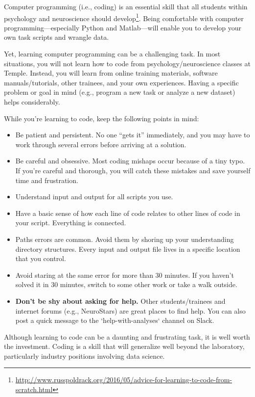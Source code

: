 \documentclass[letterpaper,12pt,oneside]{memoir}
\begin{document}
Computer programming (i.e., coding) is an essential skill that all students within psychology and neuroscience should develop\footnote{\url{http://www.russpoldrack.org/2016/05/advice-for-learning-to-code-from-scratch.html}}. Being comfortable with computer programming---especially Python and Matlab---will enable you to develop your own task scripts and wrangle data. 

Yet, learning computer programming can be a challenging task. In most situations, you will not learn how to code from psychology/neuroscience classes at Temple. Instead, you will learn from online training materials, software manuals/tutorials, other trainees, and your own experiences. Having a specific problem or goal in mind (e.g., program a new task or analyze a new dataset) helps considerably.

While you're learning to code, keep the following points in mind:

\begin{itemize}

\item Be patient and persistent. No one ``gets it'' immediately, and you may have to work through several errors before arriving at a solution. 
\item Be careful and obsessive. Most coding mishaps occur because of a tiny typo. If you're careful and thorough, you will catch these mistakes and save yourself time and frustration. 
\item Understand input and output for all scripts you use.
\item Have a basic sense of how each line of code relates to other lines of code in your script. Everything is connected. 
\item Paths errors are common. Avoid them by shoring up your understanding directory structures. Every input and output file lives in a specific location that you control. 
\item Avoid staring at the same error for more than 30 minutes. If you haven't solved it in 30 minutes, switch to some other work or take a walk outside.
\item \textbf{Don't be shy about asking for help.} Other students/trainees and internet forums (e.g., NeuroStars) are great places to find help. You can also post a quick message to the `help-with-analyses` channel on Slack.

\end{itemize}


\begin{shaded}
\noindent Although learning to code can be a daunting and frustrating task, it is well worth the investment. Coding is a skill that will generalize well beyond the laboratory, particularly industry positions involving data science. 
\end{shaded}
\end{document}
